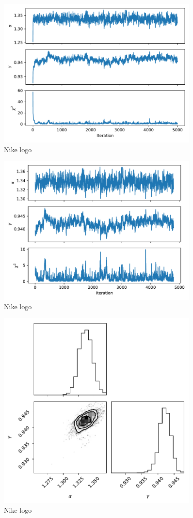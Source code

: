 \documentclass{article}
\begin{document}
\begin{figure}
    \centering
    \includegraphics[width=0.9\textwidth]{figs/hmc.pdf}
    \caption{Nike logo}
    \label{fig:hmc}
\end{figure}
\begin{figure}
    \centering
    \includegraphics[width=0.9\textwidth]{figs/hmc_burnin.pdf}
    \caption{Nike logo}
    \label{fig:hmc_burnin}
\end{figure}
\begin{figure}
    \centering
    \includegraphics[width=0.9\textwidth]{figs/hmc_corner.pdf}
    \caption{Nike logo}
    \label{fig:hmc_corner}
\end{figure}

\printbibliography
\end{document}

